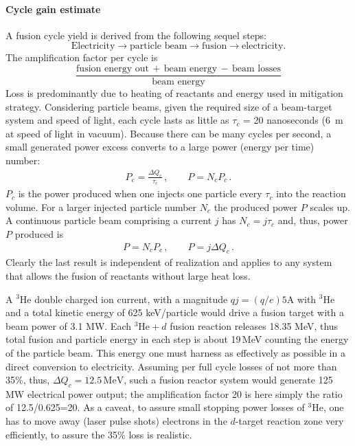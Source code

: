 \documentclass[particles,article,accept,pdftex,moreauthors]{Definitions/mdpi}
\begin{document}
\paragraph*{\bf Cycle gain estimate}
A fusion cycle yield is derived from the following sequel steps:
\[
\text{Electricity}\to\text{particle beam}\to\text{fusion}\to\text{electricity.}
\]
The amplification factor per cycle is
\[
\frac{\text{fusion energy out}\,+\,\text{beam energy}\,-\,\text{beam losses}}{\text{beam energy}}
\]
Loss is predominantly due to heating of reactants and energy used in mitigation strategy. Considering particle beams, given the required size of a beam-target system and speed of light, each cycle lasts as little as $\tau_c$ = 20 nanoseconds (6~m at speed of light in vacuum). Because there can be many cycles per second, a small generated power excess converts to a large power (energy per time) number:
 \begin{align}
 P_c=\frac{\Delta Q_c}{\tau_c}\,, \qquad P= N_cP_c\,.
\end{align}
$P_c$ is the power produced when one injects one particle every $\tau_c$ into the reaction volume. For a larger injected particle number $N_c$ the produced power $P$ scales up. A continuous particle beam comprising a current $j$ has $N_c=j\tau_c$ and, thus, power $P$ produced is
 \begin{align}
 P= N_cP_c\,, \qquad P=j\Delta Q_c\,.
\end{align}
Clearly the last result is independent of realization and applies to any system that allows the fusion of reactants without large heat loss.

A ${}^3\mathrm{He}$ double charged ion current, with a magnitude $qj= (q/e) 5 \mathrm{A}$ with ${}^3\mathrm{He}$ and a total kinetic energy of 625 keV/particle would drive a fusion target with a beam power of 3.1 MW. Each ${}^3\mathrm{He}+d$ fusion reaction releases 18.35 MeV, thus total fusion and particle energy in each step is about 19\,MeV counting the energy of the particle beam. This energy one must harness as effectively as possible in a direct conversion to electricity. Assuming per full cycle losses of not more than 35\%, thus, $\Delta Q_c=12.5\,\mathrm{MeV}$, such a fusion reactor system would generate 125\,MW electrical power output; the amplification factor 20 is here simply the ratio of 12.5/0.625=20. As a caveat, to assure small stopping power losses of ${}^3\mathrm{He}$, one has to move away (laser pulse shots) electrons in the $d$-target reaction zone very efficiently, to assure the 35\% loss is realistic.
\end{document}
